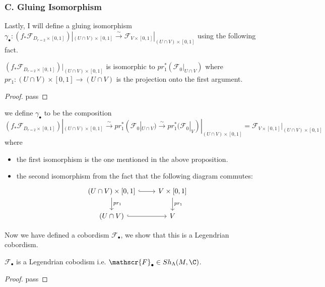 \subsubsection{C. Gluing Isomorphism}
Lastly, I will define a gluing isomorphism $\gamma_\bullet : (f_*\mathscr{F}_{D_{r=2}\times [0,1]})|_{(U\cap V)\times [0,1]} \xrightarrow{\sim} \mathscr{F}_{V\times [0,1]}|_{(U\cap V)\times [0,1]}$ using the following fact.
\begin{proposition}
$(f_*\mathscr{F}_{D_{r=2}\times [0,1]})|_{(U\cap V)\times[0,1]}$ is isomorphic to $pr_1^*(\mathscr{F}_0|_{U\cap V})$ where $pr_1 : (U\cap V) \times [0,1] \rightarrow (U\cap V)$ is the projection onto the first argument.
\end{proposition}
\begin{proof}
pass
\end{proof}
\begin{definition}
we define $\gamma_\bullet$ to be the composition 
\[
(f_*\mathscr{F}_{D_{r=2}\times [0,1]})|_{(U\cap V)\times [0,1]}\xrightarrow{\sim}pr_1^*(\mathscr{F}_0|_{U\cap V})\xrightarrow{\sim}pr_1^*(\mathscr{F}_0|_{V})|_{(U\cap V)\times [0,1]}=\mathscr{F}_{V\times [0,1]}|_{(U\cap V)\times [0,1]}
\]
where
\begin{itemize}
\item the first isomorphism is the one mentioned in the above proposition.

\item the second isomorphism from the fact that the following diagram commutes:
\[
\begin{tikzcd}
(U\cap V)\times [0,1] \arrow[hookrightarrow]{r}\arrow[d, "pr_1"]     & V\times [0,1] \arrow[d, "pr_1"] \\
(U\cap V) \arrow[hookrightarrow]{r} & V 
\end{tikzcd}
\]
\end{itemize}
\end{definition}

Now we have defined a cobordism $\mathscr{F}_\bullet$, we show that this is a Legendrian cobordism.
\begin{proposition}
$\mathscr{F}_\bullet$ is a Legendrian cobodism i.e. $\mathscr{F}_\bullet \in Sh_\Lambda(M,\C)$.
\end{proposition}
\begin{proof}
pass
\end{proof}

